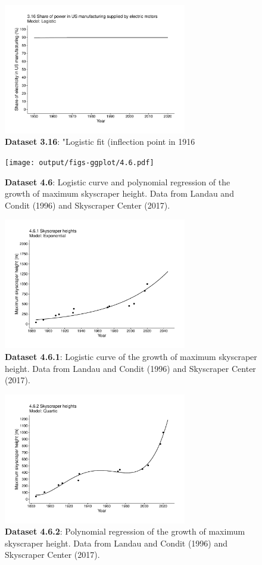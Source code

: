 \documentclass[aps,rmp,preprint,superscriptaddress,10pt,onecolumn]{article}
\begin{document}
\begin{figure}[h]
\includegraphics[width=8cm]{output/figs-ggplot/3.16.pdf}
\caption{\textbf{Dataset 3.16}: "Logistic fit (inflection point in 1916}
\end{figure}
	
\begin{figure}[h]
\texttt{[image: output/figs-ggplot/4.6.pdf]}
\caption{\textbf{Dataset 4.6}: Logistic curve and polynomial regression of the growth of maximum skyscraper height. Data from Landau and Condit (1996) and Skyscraper Center (2017).}
\end{figure}
	
\begin{figure}[h]
\includegraphics[width=8cm]{output/figs-ggplot/4.6.1.pdf}
\caption{\textbf{Dataset 4.6.1}: Logistic curve of the growth of maximum skyscraper height. Data from Landau and Condit (1996) and Skyscraper Center (2017).}
\end{figure}
	
\begin{figure}[h]
\includegraphics[width=8cm]{output/figs-ggplot/4.6.2.pdf}
\caption{\textbf{Dataset 4.6.2}: Polynomial regression of the growth of maximum skyscraper height. Data from Landau and Condit (1996) and Skyscraper Center (2017). }
\end{figure}
	
\end{document}
